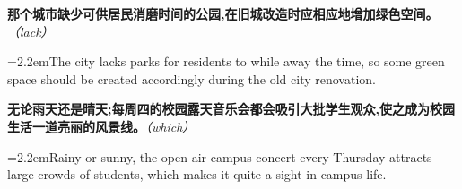 \documentclass[11pt,a4paper]{article}
\newcommand{\num}[1]{\makebox[1.9em][r]{#1.}\hspace{0.3em}}
\newcommand{\prompt}[1]{\emph{\textcolor{tipblue}{\small（#1）}}}
\begin{document}
\begin{minipage}{\linewidth}

\num{31}\textbf{那个城市缺少可供居民消磨时间的公园,在旧城改造时应相应地增加绿色空间。}\prompt{lack}

\vspace{0.15em}

\noindent\hangindent=2.2em\hspace{2.2em}The city lacks parks for residents to while away the time, so some green space should be created accordingly during the old city renovation.

\end{minipage}

\begin{minipage}{\linewidth}

\num{32}\textbf{无论雨天还是晴天;每周四的校园露天音乐会都会吸引大批学生观众,使之成为校园生活一道亮丽的风景线。}\prompt{which}

\vspace{0.15em}

\noindent\hangindent=2.2em\hspace{2.2em}Rainy or sunny, the open-air campus concert every Thursday attracts large crowds of students, which makes it quite a sight in campus life.

\end{minipage}
\end{document}
